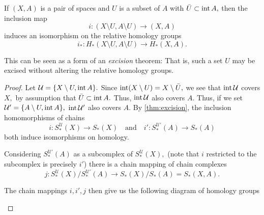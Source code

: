 \documentclass[12pt]{article}
\begin{document}
\begin{thm} \label{thm:excisionhomology}
	If $(X, A)$ is a pair of spaces and $U$ is a subset of $A$ with $\bar{U} \subset \operatorname{int} A,$ then the inclusion map
	\begin{equation*} 
		i:(X\setminus U, A\setminus U) \to (X, A)
	\end{equation*}
	induces an isomorphism on the relative homology groups
	\begin{equation*} 
		i_*:H_*(X\setminus U, A\setminus U) \to H_*(X, A).
	\end{equation*}
\end{thm}
This can be seen as a form of an \emph{excision} theorem: That is, such a set $U$ may be excised without altering the relative homology groups.
\begin{proof} 
	Let $\mathcal{U} = \{X \setminus U, \operatorname{int} A\}.$ Since $\operatorname{int}(X \setminus U) = X \setminus \bar{U},$ we see that $\operatorname{int} \mathcal{U}$ covers $X,$ by assumption that $\bar{U} \subset \operatorname{int} A.$ Thus, $\operatorname{int} \mathcal{U}$ also covers $A.$ Thus, if we set $\mathcal{U}' = \{A \setminus U, \operatorname{int} A\},$ $\operatorname{int} \mathcal{U}'$ also covers $A.$ By \cref{thm:excision}, the inclusion homomorphisms of chains
	\begin{equation*} 
		i:S_*^{\mathcal{U}}(X) \to S_*(X) \quad\text{and}\quad i':S_*^{\mathcal{U'}}(A) \to S_*(A)
	\end{equation*}
	both induce isomorphisms on homology.

	Considering $S^{\mathcal{U}'}_*(A)$ as a subcomplex of $S^{\mathcal{U}}_*(X),$ (note that $i$ restricted to the subcomplex is precisely $i'$) there is a chain mapping of chain complexes
	\begin{equation*} 
		j:S^{\mathcal{U}}_*(X)/S^{\mathcal{U}'}_*(A) \to S_*(X)/S_*(A) = S_*(X, A).
	\end{equation*}

	The chain mappings $i, i', j$ then give us the following diagram of homology groups

	\begin{center}
	\end{center}


\end{proof}
\end{document}
